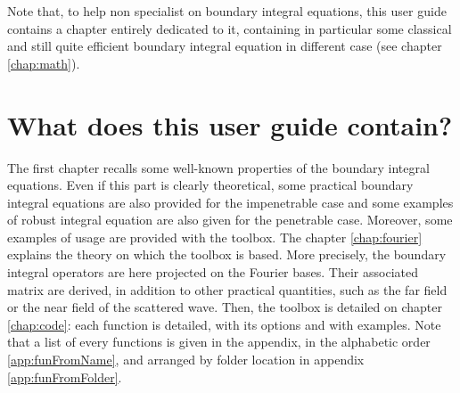 Note that, to help non specialist on boundary integral equations, this user guide contains a chapter entirely dedicated to it, containing in particular some classical and still quite efficient boundary integral equation in different case (see chapter \ref{chap:math}).

\section*{What does this user guide contain?}

The first chapter recalls some well-known properties of the boundary integral equations. Even if this part is clearly theoretical, some practical boundary integral equations are also provided for the impenetrable case and some examples of robust integral equation are also given for the penetrable case. Moreover, some examples of usage are provided with the \mudiff toolbox. The chapter \ref{chap:fourier} explains the theory on which the \mudiff toolbox is based. More precisely, the boundary integral operators are here projected on the Fourier bases. Their associated matrix are derived, in addition to other practical quantities, such as the far field or the near field of the scattered wave. Then, the \mudiff toolbox is detailed on chapter  \ref{chap:code}: each function is detailed, with its options and with examples. Note that a list of every functions is given in the appendix, in the alphabetic order \ref{app:funFromName}, and arranged by folder location in appendix \ref{app:funFromFolder}.

